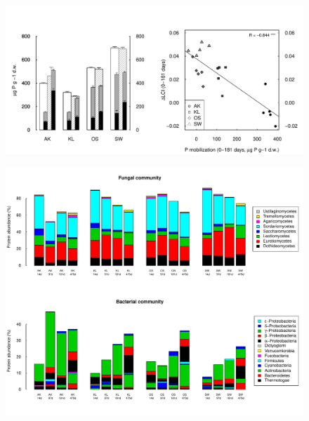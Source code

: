 \documentclass[10pt]{article}
\begin{document}
\begin{flushleft}
\begin{figure}[!h]
\begin{center}
\includegraphics{ligpaper-figphos}
\end{center}
\end{figure}


\newpage
\begin{figure}[h!]
\vspace*{2mm}
\begin{center}
\includegraphics{ligpaper-metaprot2}
\end{center}
\end{figure}



\end{flushleft}
\end{document}

